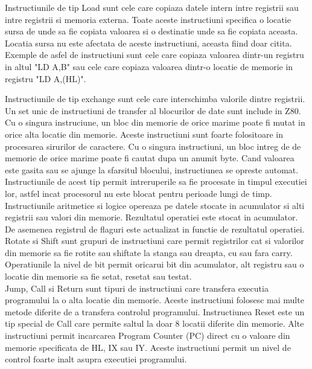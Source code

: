 \documentclass[titlepage,12pt]{article}
\begin{document}
Instructiunile de tip Load sunt cele care copiaza datele intern intre registrii sau intre registrii si memoria externa.
Toate aceste instructiuni specifica o locatie sursa de unde sa fie copiata valoarea si o destinatie unde sa fie copiata aceasta.
Locatia sursa nu este afectata de aceste instructiuni, aceasta fiind doar citita.
Exemple de asfel de instructiuni sunt cele care copiaza valoarea dintr-un registru in altul "LD A,B" sau cele care copiaza valoarea dintr-o locatie de memorie in registru "LD A,(HL)".

Instructiunile de tip exchange sunt cele care interschimba valorile dintre registrii.\\

Un set unic de instructiuni de transfer al blocurilor de date sunt include in \ac {Z80}.
Cu o singura instruciune, un bloc din memorie de orice marime poate fi mutat in orice alta locatie din memorie.
Aceste instructiuni sunt foarte folositoare in procesarea sirurilor de caractere.
Cu o singura instructiuni, un bloc intreg de de memorie de orice marime poate fi cautat dupa un anumit byte.
Cand valoarea este gasita sau se ajunge la sfarsitul blocului, instructiunea se opreste automat.
Instructiunile de acest tip permit intreruperile sa fie procesate in timpul executiei lor, astfel incat procesorul nu este blocat pentru perioade lungi de timp.\\

Instructiunile aritmetice si logice opereaza pe datele stocate in acumulator si alti registrii sau valori din memorie.
Rezultatul operatiei este stocat in acumulator.
De asemenea registrul de flaguri este actualizat in functie de rezultatul operatiei.\\

Rotate si Shift sunt grupuri de instructiuni care permit registrilor cat si valorilor din memorie sa fie rotite sau shiftate la stanga sau dreapta, cu sau fara carry.\\

Operatiunile la nivel de bit permit oricarui bit din acumulator, alt registru sau o locatie din memorie sa fie setat, resetat sau testat.\\

Jump, Call si Return sunt tipuri de instructiuni care transfera executia programului la o alta locatie din memorie.
Aceste instructiuni folosesc mai multe metode diferite de a transfera controlul programului.
Instructiunea Reset este un tip special de Call care permite saltul la doar 8 locatii diferite din memorie.
Alte instructiuni permit incarcarea Program Counter (PC) direct cu o valoare din memorie specificata de HL, IX sau IY.
Aceste instructiuni permit un nivel de control foarte inalt asupra executiei programului.\\
\end{document}
